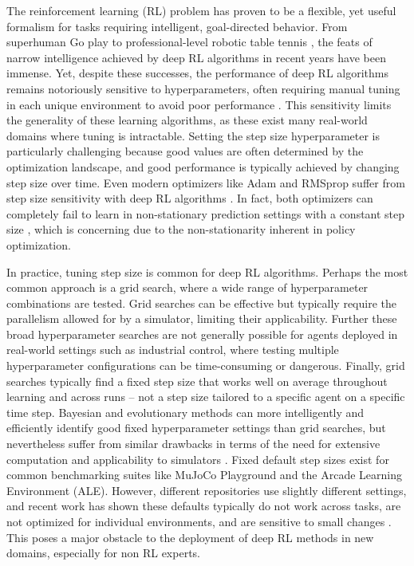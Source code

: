 The reinforcement learning (RL) problem has proven to be a flexible, yet useful formalism for tasks requiring intelligent, goal-directed behavior. From superhuman Go play  to professional-level robotic table tennis , the feats of narrow intelligence achieved by deep RL algorithms in recent years have been immense. Yet, despite these successes, the performance of deep RL algorithms remains notoriously sensitive to hyperparameters, often requiring manual tuning in each unique environment to avoid poor performance \cite{eimer2023hyperparameters,adkins2024method}. This sensitivity limits the generality of these learning algorithms, as these exist many real-world domains where tuning is intractable. Setting the step size hyperparameter is particularly challenging because good values are often determined by the optimization landscape, and good performance is typically achieved by changing step size over time. Even modern optimizers like Adam and RMSprop suffer from step size sensitivity with deep RL algorithms \cite{ellis2024adam,donancio2024dynamic,jordan2024cliff}. In fact, both optimizers can completely fail to learn in non-stationary prediction settings with a constant step size \cite{jacobsen2019meta,degris2024step}, which is concerning due to the non-stationarity inherent in policy optimization.

In practice, tuning step size is common for deep RL algorithms. Perhaps the most common
approach is a grid search, where a wide range of hyperparameter combinations are tested. Grid searches can be
effective but typically require the parallelism allowed for by a simulator, limiting their applicability. Further these broad hyperparameter searches are not generally possible for agents deployed in real-world settings such as industrial control\cite{luo2022controlling,janjua2024gvfs}, where testing multiple
hyperparameter configurations can be time-consuming or dangerous. Finally, grid searches typically find a fixed step size that works well on average throughout learning and across runs -- not a step size tailored to a specific agent on a specific time step.
Bayesian and evolutionary methods can more intelligently and efficiently identify good fixed hyperparameter settings than
grid searches, but nevertheless suffer from similar drawbacks in terms of the need for extensive computation and applicability to simulators \cite{parker2022automated}. Fixed default step sizes exist for common
benchmarking suites like MuJoCo Playground and the Arcade Learning Environment (ALE). 
However, different repositories use slightly different settings, and recent work has shown these
defaults typically do not work across tasks, are not optimized for individual environments, and are sensitive to
small changes \cite{patterson2024chtb,adkins2024method,eimer2023hyperparameters}.
This poses a major obstacle to the deployment of deep RL methods in new domains, especially for non RL experts.

